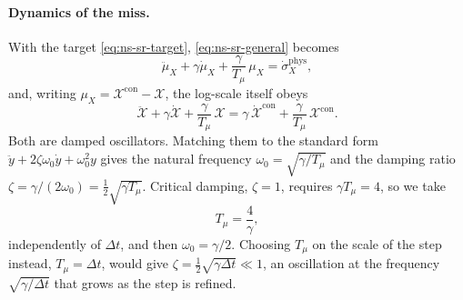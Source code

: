 \documentclass{article}
\begin{document}
\paragraph{Dynamics of the miss.}
With the target \eqref{eq:ns-sr-target}, \eqref{eq:ns-sr-general} becomes
\begin{equation}\label{eq:ns-sr-miss}
  \ddot \mu_X + \gamma \dot \mu_X + \frac{\gamma}{T_\mu}\, \mu_X = \dot \sigma_X^{\mathrm{phys}},
\end{equation}
and, writing $\mu_X = \mathcal{X}^{\mathrm{con}} - \mathcal{X}$, the
log-scale itself obeys
\begin{equation}\label{eq:ns-sr-scale}
  \ddot{\mathcal{X}} + \gamma \dot{\mathcal{X}} + \frac{\gamma}{T_\mu}\, \mathcal{X}
  = \gamma\, \dot{\mathcal{X}}^{\mathrm{con}} + \frac{\gamma}{T_\mu}\, \mathcal{X}^{\mathrm{con}} .
\end{equation}
Both are damped oscillators. Matching them to the standard form
$\ddot y + 2 \zeta \omega_0 \dot y + \omega_0^2 y$ gives the natural
frequency $\omega_0 = \sqrt{\gamma/T_\mu}$ and the damping ratio
$\zeta = \gamma / (2 \omega_0) = \tfrac12 \sqrt{\gamma T_\mu}$.
Critical damping, $\zeta = 1$, requires $\gamma T_\mu = 4$, so we take
\begin{equation}\label{eq:ns-sr-tmu}
  T_\mu = \frac{4}{\gamma},
\end{equation}
independently of $\Delta t$, and then $\omega_0 = \gamma/2$. Choosing
$T_\mu$ on the scale of the step instead, $T_\mu = \Delta t$, would give
$\zeta = \tfrac12 \sqrt{\gamma \Delta t} \ll 1$, an oscillation at the
frequency $\sqrt{\gamma/\Delta t}$ that grows as the step is refined.\par
\end{document}
